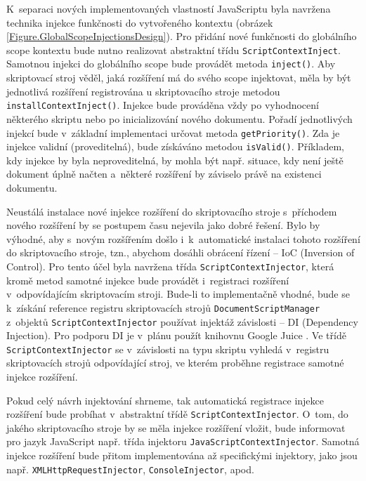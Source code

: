 K~separaci nových implementovaných vlastností JavaScriptu byla navržena technika injekce funkčnosti do vytvořeného kontextu (obrázek \ref{Figure.GlobalScopeInjectionsDesign}). Pro přidání nové funkčnosti do globálního scope  kontextu bude nutno realizovat abstraktní třídu \texttt{ScriptContextInject}. Samotnou injekci do globálního scope  bude provádět metoda \texttt{inject()}. Aby skriptovací stroj věděl, jaká rozšíření má do svého scope injektovat, měla by být jednotlivá rozšíření registrována u skriptovacího stroje metodou \texttt{installContextInject()}. Injekce bude prováděna vždy po vyhodnocení některého skriptu nebo po inicializování nového dokumentu. Pořadí jednotlivých injekcí bude v~základní implementaci určovat metoda \texttt{getPriority()}. Zda je injekce validní (proveditelná), bude získáváno metodou \texttt{isValid()}. Příkladem, kdy injekce by byla neproveditelná, by mohla být např. situace, kdy není ještě dokument úplně načten a~některé rozšíření by záviselo právě na existenci dokumentu.

Neustálá instalace nové injekce rozšíření do skriptovacího stroje s~příchodem nového rozšíření by se postupem času nejevila jako dobré řešení. Bylo by výhodné, aby s~novým rozšířením došlo i~k~automatické instalaci tohoto rozšíření do skriptovacího stroje, tzn., abychom dosáhli obrácení řízení -- IoC (Inversion of Control). Pro tento účel byla navržena třída \texttt{ScriptContextInjector}, která kromě metod samotné injekce bude provádět i~registraci rozšíření v~odpovídajícím skriptovacím stroji. Bude-li to implementačně vhodné, bude se k~získání reference registru skriptovacích strojů \texttt{DocumentScriptManager} z~objektů \texttt{ScriptContextInjector} používat injektáž závislosti -- DI (Dependency Injection). Pro podporu DI je v~plánu použít knihovnu Google Juice \cite{Bibliography.Google.Juice}. Ve třídě \texttt{ScriptContextInjector} se v~závislosti na typu skriptu vyhledá v~registru skriptovacích strojů odpovídající stroj, ve kterém proběhne registrace samotné injekce rozšíření. 

Pokud celý návrh injektování shrneme, tak automatická registrace injekce rozšíření bude probíhat v~abstraktní třídě \texttt{ScriptContextInjector}. O~tom, do jakého skriptovacího stroje by se měla injekce rozšíření vložit, bude informovat pro jazyk JavaScript např. třída injektoru \texttt{JavaScriptContextInjector}. Samotná injekce rozšíření bude přitom implementována až specifickými injektory, jako jsou např. \texttt{XMLHttpRequestInjector}, \texttt{ConsoleInjector}, apod.

